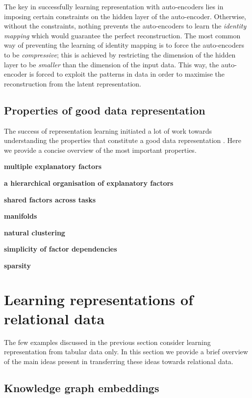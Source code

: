 The key in successfully learning representation with auto-encoders lies in imposing certain constraints on the hidden layer of the auto-encoder.
Otherwise, without the constraints, nothing prevents the auto-encoders to learn the \textit{identity mapping} which would guarantee the perfect reconstruction.
The most common way of preventing the learning of identity mapping is to force the auto-encoders to be \textit{compressive}; this is achieved by restricting the dimension of the hidden layer to be \textit{smaller} than the dimension of the input data.
This way, the auto-encoder is forced to exploit the patterns in data in order to maximise the reconstruction from the latent representation.






\subsection{Properties of good data representation}


The success of representation learning initiated a lot of work towards understanding the properties that constitute a good data representation \cite{Bengio2013RLR}.
Here we provide a concise overview of the most important properties.


\textbf{multiple explanatory factors}

\textbf{a hierarchical organisation of explanatory factors}

\textbf{shared factors across tasks}

\textbf{manifolds}

\textbf{natural clustering}

\textbf{simplicity of factor dependencies}

\textbf{sparsity}








\section{Learning representations of relational data}


The few examples discussed in the previous section consider learning representation from tabular data only.
In this section we provide a brief overview of the main ideas present in transferring these ideas towards relational data.


\subsection{Knowledge graph embeddings}

